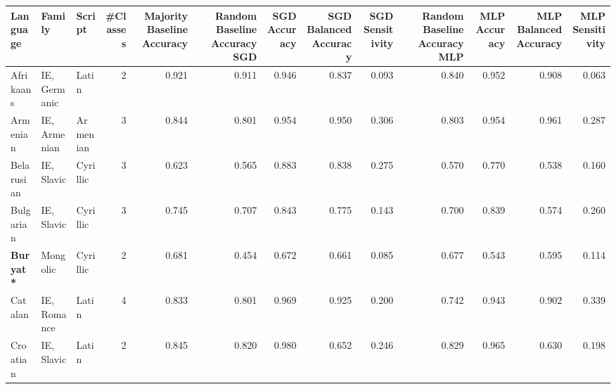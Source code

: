 \begin{tabular}{lllrrrrrrrrrr}
\toprule
               Language &                          Family &     Script &  #Classes &  Majority Baseline Accuracy &  Random Baseline Accuracy SGD &  SGD Accuracy &  SGD Balanced Accuracy &  SGD Sensitivity &  Random Baseline Accuracy MLP &  MLP Accuracy &  MLP Balanced Accuracy &  MLP Sensitivity \\
\midrule
              Afrikaans &                    IE, Germanic &      Latin &         2 &                       0.921 &                         0.911 &         0.946 &                  0.837 &            0.093 &                         0.840 &         0.952 &                  0.908 &            0.063 \\
               Armenian &                    IE, Armenian &   Armenian &         3 &                       0.844 &                         0.801 &         0.954 &                  0.950 &            0.306 &                         0.803 &         0.954 &                  0.961 &            0.287 \\
             Belarusian &                      IE, Slavic &   Cyrillic &         3 &                       0.623 &                         0.565 &         0.883 &                  0.838 &            0.275 &                         0.570 &         0.770 &                  0.538 &            0.160 \\
              Bulgarian &                      IE, Slavic &   Cyrillic &         3 &                       0.745 &                         0.707 &         0.843 &                  0.775 &            0.143 &                         0.700 &         0.839 &                  0.574 &            0.260 \\
       \textbf{Buryat*} &                        Mongolic &   Cyrillic &         2 &                       0.681 &                         0.454 &         0.672 &                  0.661 &            0.085 &                         0.677 &         0.543 &                  0.595 &            0.114 \\
                Catalan &                     IE, Romance &      Latin &         4 &                       0.833 &                         0.801 &         0.969 &                  0.925 &            0.200 &                         0.742 &         0.943 &                  0.902 &            0.339 \\
               Croatian &                      IE, Slavic &      Latin &         2 &                       0.845 &                         0.820 &         0.980 &                  0.652 &            0.246 &                         0.829 &         0.965 &                  0.630 &            0.198 \\

\end{tabular}
